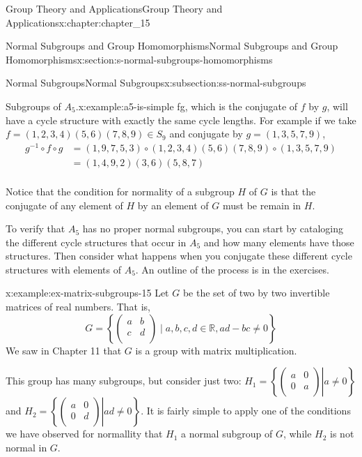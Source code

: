\documentclass[twoside,10pt,]{book}
\numberwithin{equation}{section}
\begin{document}
\begin{chapterptx}{Group Theory and Applications}{}{Group Theory and Applications}{}{}{x:chapter:chapter_15}
\begin{sectionptx}{Normal Subgroups and Group Homomorphisms}{}{Normal Subgroups and Group Homomorphisms}{}{}{x:section:s-normal-subgroups-homomorphisms}
\begin{subsectionptx}{Normal Subgroups}{}{Normal Subgroups}{}{}{x:subsection:ss-normal-subgroups}
\begin{example}{Subgroups of \(A_5\).}{x:example:a5-is-simple}
f\circ g\), which is the conjugate of \(f\) by \(g\),  will have a cycle structure with exactly the same cycle lengths.   For example if we take \(f=(1,2,3,4)(5,6)(7,8,9)\in S_9\) and conjugate by \(g=(1,3,5,7,9)\),%
\begin{equation*}
\begin{split}
g^{-1}\circ f\circ g & =(1,9,7,5,3)\circ (1,2,3,4)(5,6)(7,8,9)\circ (1,3,5,7,9)\\
& = (1,4,9,2)(3,6)(5,8,7)\\
\end{split}
\end{equation*}
%
\par
Notice that the condition for normality of a subgroup \(H\) of \(G\) is that the conjugate of any element of \(H\) by an element of \(G\) must be remain in \(H\).%
\par
To verify that \(A_5\) has no proper normal subgroups, you can start by cataloging the different cycle structures that occur in \(A_5\) and how many elements have those structures.   Then consider what happens when you conjugate these different cycle structures with elements of \(A_5\). An outline of the process is in the exercises.%
\end{example}
\begin{example}{}{x:example:ex-matrix-subgroups-15}%
Let \(G\) be the set of two by two invertible matrices of real numbers.  That is,%
\begin{equation*}
G=\left\{\left(
\begin{array}{cc}
a & b \\
c & d \\
\end{array}
\right) \mid a,b,c,d\in \mathbb{R}, a d-b c\neq 0\right\}
\end{equation*}
We saw in Chapter 11 that \(G\) is a group with matrix multiplication.%
\par
This group has many subgroups, but consider just two: \(H_1=\left\{\left.\left(
\begin{array}{cc}
a & 0 \\
0 & a \\
\end{array}
\right)\right| a \neq 0\right\}\)   and \(H_2=\left\{\left.\left(
\begin{array}{cc}
a & 0 \\
0 & d \\
\end{array}
\right)\right| a d \neq 0\right\}\). It is fairly simple to apply one of the conditions we have observed for normallity that \(H_1\) a normal subgroup of \(G\), while \(H_2\) is not normal in \(G\).%

\end{example}
\end{subsectionptx}
\end{sectionptx}
\end{chapterptx}
\end{document}
